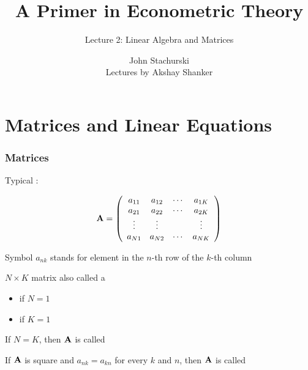 






\title{A Primer in Econometric Theory}

\subtitle
{Lecture 2: Linear Algebra and Matrices}

\author{John Stachurski \\ \tiny Lectures by Akshay Shanker}






\begin{frame}
  \titlepage
\end{frame}

\section{Matrices and Linear Equations}

\begin{frame}
    
    \vspace{2em}
    \frametitle{Matrices}

    Typical : 
    
    \begin{equation*}
        \mathbf A = 
        \left(
        \begin{array}{cccc}
            a_{11} & a_{12} & \cdots & a_{1K} \\
            a_{21} & a_{22} & \cdots & a_{2K} \\
            \vdots & \vdots &  & \vdots \\
            a_{N1} & a_{N2} & \cdots & a_{NK} 
        \end{array}
        \right)
    \end{equation*}

    Symbol $a_{nk}$ stands for element in the $n$-th row of the $k$-th column

\end{frame}


\begin{frame}
    
    \vspace{2em}
    $N \times K$ matrix also called a 
    \begin{itemize}
        \item {} if $N = 1$
        \item {} if $K = 1$
    \end{itemize}
    
    \vspace{.7em}
    If $N = K$, then $\mathbf A$ is called 
    
    If $\mathbf A$ is square and $a_{nk} = a_{kn}$ for every $k$ and $n$, then $\mathbf A$ is called    
    
\end{frame}

